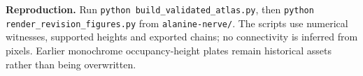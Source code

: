 \textbf{Reproduction.}
Run \texttt{python build\_validated\_atlas.py}, then
\texttt{python render\_revision\_figures.py} from \texttt{alanine-nerve/}.
The scripts use numerical witnesses, supported heights and exported chains;
no connectivity is inferred from pixels. Earlier monochrome occupancy-height
plates remain historical assets rather than being overwritten.
